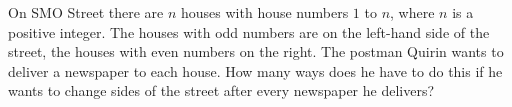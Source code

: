 On SMO Street there are $n$ houses with house numbers $1$ to $n$, where $n$ is a positive integer.
The houses with odd numbers are on the left-hand side of the street, the houses with even numbers on the right.
The postman Quirin wants to deliver a newspaper to each house.
How many ways does he have to do this if he wants to change sides of the street after every newspaper he delivers?
